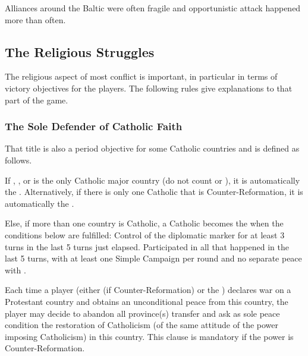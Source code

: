 \begin{designnote}
  Alliances around the Baltic were often fragile and opportunistic attack
  happened more than often.
\end{designnote}

\subsection{The Religious Struggles}

The religious aspect of most conflict is important, in particular in terms of
victory objectives for the players. The following rules give explanations to
that part of the game.


\subsubsection{The Sole Defender of Catholic Faith}\label{chSpecific:Catholic
  Faith}
\aparag That title is also a period objective for some Catholic countries and
is defined as follows.

\aparag If \FRA, \SPA, \ENG or \POL is the only Catholic major country (do not
count \POR or \VEN), it is automatically the .
\bparag Alternatively, if there is only one Catholic \MAJ that is
Counter-Reformation, it is automatically the .

\aparag Else, if more than one country is Catholic, a Catholic \MAJ becomes
the  when the conditions below are
fulfilled:
\bparag Control of the  diplomatic marker for at least 3 turns
in the last 5 turns just elapsed.
\bparag Participated in all  that happened in the last 5
turns, with at least one Simple Campaign per round and no separate peace with
\TUR.


 Each time a player
(either \SPA (if Counter-Reformation) or the ) declares war on a Protestant country and obtains an
unconditional peace from this country, the player may decide to abandon all
province(s) transfer and ask as sole peace condition the restoration of
Catholicism (of the same attitude of the power imposing Catholicism) in this
country.
\bparag This clause is mandatory if the power is Counter-Reformation.

